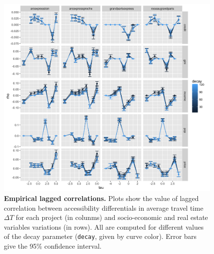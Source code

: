 \documentclass[english]{./sageo}
\begin{document}
\begin{figure}[h]
\hspace{-1cm}
\includegraphics[width=14cm]{laggedcorrs_times_allvars}
\caption{\textbf{Empirical lagged correlations.} Plots show the value of lagged correlation between accessibility differentials in average travel time $\Delta T$ for each project (in colunms) and socio-economic and real estate variables variations (in rows). All are computed for different values of the decay parameter (\texttt{decay}, given by curve color). Error bars give the 95\% confidence interval.}
\label{fig:empiricalres}
\end{figure}
\end{document}

